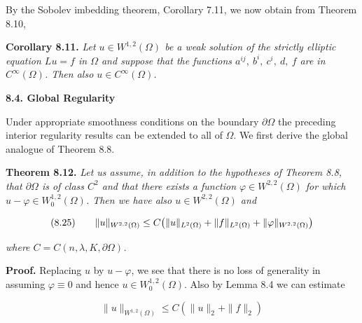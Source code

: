By the Sobolev imbedding theorem, Corollary 7.11, we now obtain from Theorem 8.10,

\textbf{Corollary 8.11.} \textit{Let $u\in W^{1,2}(\Omega)$ be a weak solution of the strictly elliptic equation $Lu=f$ in $\Omega$ and suppose that the functions $a^{ij},\ b^i,\ c^i,\ d,\ f$ are in $C^\infty(\Omega)$. Then also $u\in C^\infty(\Omega)$.}

\textbf{8.4. Global Regularity}

Under appropriate smoothness conditions on the boundary $\partial\Omega$ the preceding interior regularity results can be extended to all of $\Omega$. We first derive the global analogue of Theorem 8.8.

\textbf{Theorem 8.12.} \textit{Let us assume, in addition to the hypotheses of Theorem 8.8, that $\partial\Omega$ is of class $C^2$ and that there exists a function $\varphi\in W^{2,2}(\Omega)$ for which $u-\varphi\in W_0^{1,2}(\Omega)$. Then we have also $u\in W^{2,2}(\Omega)$ and}

\[
(8.25)\qquad \lVert u\rVert_{W^{2,2}(\Omega)}\leq C\bigl(\lVert u\rVert_{L^2(\Omega)}+\lVert f\rVert_{L^2(\Omega)}+\lVert \varphi\rVert_{W^{2,2}(\Omega)}\bigr)
\]

\textit{where $C=C(n,\lambda,K,\partial\Omega)$.}



\noindent\textbf{Proof.}
Replacing $u$ by $u-\varphi$, we see that there is no loss of generality in assuming
$\varphi\equiv 0$ and hence $u\in W_0^{1,2}(\Omega)$. Also by Lemma 8.4 we can estimate

\begin{equation}
\tag{8.26}
\|u\|_{W^{1,2}(\Omega)}\le C(\|u\|_2+\|f\|_2)
\end{equation}

